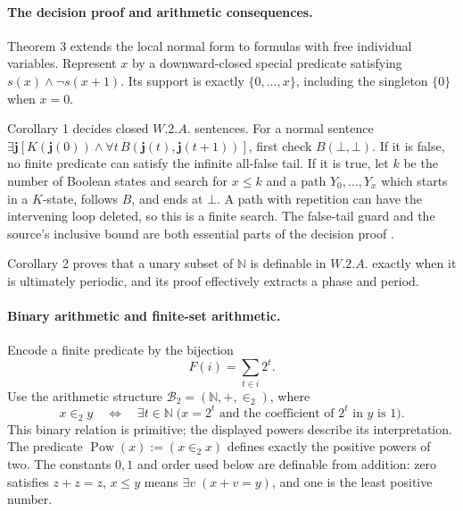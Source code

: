 \paragraph{The decision proof and arithmetic consequences.}
Theorem 3 extends the local normal form to formulas with free individual
variables.  Represent \(x\) by a downward-closed special predicate satisfying
\(s(x)\land\neg s(x+1)\).  Its support is exactly \(\{0,\ldots,x\}\),
including the singleton \(\{0\}\) when \(x=0\).

Corollary 1 decides closed \(W.2.A.\) sentences.  For a normal sentence
\(\exists\mathbf j[K(\mathbf j(0))\land\forall t\,
B(\mathbf j(t),\mathbf j(t+1))]\), first check
\(B(\bot,\bot)\).  If it is false, no finite predicate can satisfy the
infinite all-false tail.  If it is true, let \(k\) be the number of Boolean
states and search for \(x\leq k\) and a path
\(Y_0,\ldots,Y_x\) which starts in a \(K\)-state, follows \(B\), and ends at
\(\bot\).  A path with repetition can have the intervening loop deleted, so
this is a finite search.  The false-tail guard and the source's inclusive bound
are both essential parts of the decision proof
\cite[pp.~18--20]{Buchi1959WeakReport}.

Corollary 2 proves that a unary subset of \(\mathbb N\) is definable in
\(W.2.A.\) exactly when it is ultimately periodic, and its proof effectively
extracts a phase and period.

\paragraph{Binary arithmetic and finite-set arithmetic.}
Encode a finite predicate by the bijection
\[
 F(i)=\sum_{t\in i}2^t.
\]
Use the arithmetic structure \(\mathcal B_2=(\mathbb N,+,\in_2)\), where
\[
 x\mathrel{\in_2}y
 \quad\Longleftrightarrow\quad
 \exists t\in\mathbb N\;
   \bigl(x=2^t\text{ and the coefficient of }2^t\text{ in }y\text{ is }1\bigr).
\]
This binary relation is primitive; the displayed powers describe its
interpretation.  The predicate \(\operatorname{Pow}(x):=(x\in_2x)\)
defines exactly the positive powers of two.  The constants \(0,1\) and
order used below are definable from addition: zero satisfies \(z+z=z\),
\(x\leq y\) means \(\exists v\;(x+v=y)\), and one is the least positive
number.


